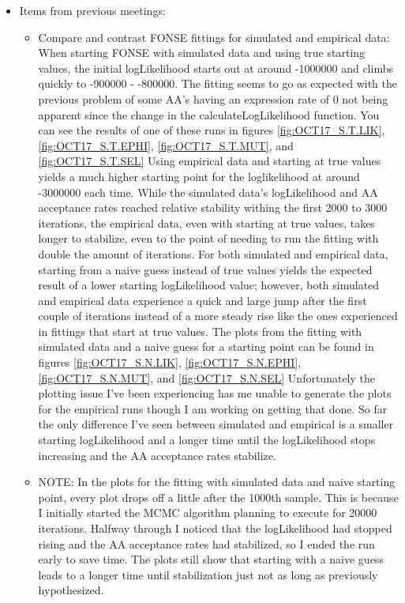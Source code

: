 \documentclass[11pt]{labbook}
\begin{document}
    \begin{itemize}
        \item Items from previous meetings:
            \begin{itemize}
                \item Compare and contrast FONSE fittings for simulated and empirical data:  When starting FONSE with simulated data and using true starting values, the initial logLikelihood starts out at around -1000000 and climbs quickly to -900000 - -800000. The fitting seems to go as expected with the previous problem of some AA's having an expression rate of 0 not being apparent since the change in the calculateLogLikelihood function. You can see the results of one of these runs in figures \ref{fig:OCT17_S.T.LIK}, \ref{fig:OCT17_S.T.EPHI}, \ref{fig:OCT17_S.T.MUT}, and \ref{fig:OCT17_S.T.SEL} Using empirical data and starting at true values yields a much higher starting point for the loglikelihood at around -3000000 each time. While the simulated data's logLikelihood and AA acceptance rates reached relative stability withing the first 2000 to 3000 iterations, the empirical data, even with starting at true values, takes longer to stabilize, even to the point of needing to run the fitting with double the amount of iterations. For both simulated and empirical data, starting from a naive guess instead of true values yields the expected result of a lower starting logLikelihood value; however, both simulated and empirical data experience a quick and large jump after the first couple of iterations instead of a more steady rise like the ones experienced in fittings that start at true values. The plots from the fitting with simulated data and a naive guess for a starting point can be found in figures \ref{fig:OCT17_S.N.LIK}, \ref{fig:OCT17_S.N.EPHI}, \ref{fig:OCT17_S.N.MUT}, and \ref{fig:OCT17_S.N.SEL} Unfortunately the plotting issue I've been experiencing has me unable to generate the plots for the empirical runs though I am working on getting that done. So far the only difference I've seen between simulated and empirical is a smaller starting logLikelihood and a longer time until the logLikelihood stops increasing and the AA acceptance rates stabilize.
                \item NOTE: In the plots for the fitting with simulated data and naive starting point, every plot drops off a little after the 1000th sample. This is because I initially started the MCMC algorithm planning to execute for 20000 iterations. Halfway through I noticed that the logLikelihood had stopped rising and the AA acceptance rates had stabilized, so I ended the run early to save time. The plots still show that starting with a naive guess leads to a longer time until stabilization just not as long as previously hypothesized.
            \end{itemize}
    \end{itemize}
    
\end{document}
